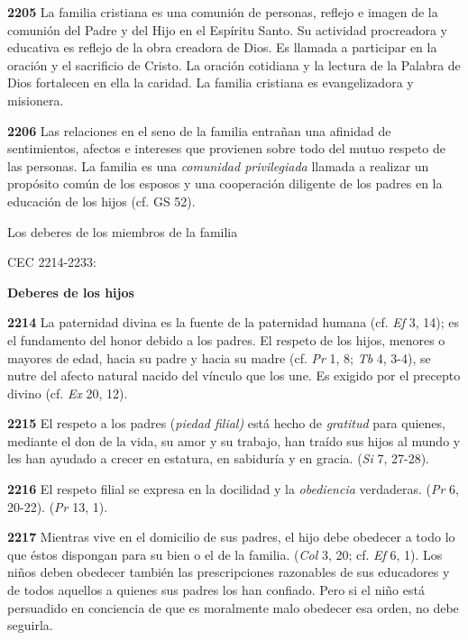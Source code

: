 \begin{body}
\begin{body}
\textbf{2205} La familia cristiana es una comunión de personas, reflejo e imagen de la comunión del Padre y del Hijo en el Espíritu Santo. Su actividad procreadora y educativa es reflejo de la obra creadora de Dios. Es llamada a participar en la oración y el sacrificio de Cristo. La oración cotidiana y la lectura de la Palabra de Dios fortalecen en ella la caridad. La familia cristiana es evangelizadora y misionera.

\textbf{2206} Las relaciones en el seno de la familia entrañan una afinidad de sentimientos, afectos e intereses que provienen sobre todo del mutuo respeto de las personas. La familia es una \emph{comunidad privilegiada} llamada a realizar un propósito común de los esposos y una cooperación diligente de los padres en la educación de los hijos (cf. GS 52).

Los deberes de los miembros de la familia

CEC 2214-2233:

\textbf{Deberes de los hijos}

\textbf{2214} La paternidad divina es la fuente de la paternidad humana (cf. \emph{Ef} 3, 14); es el fundamento del honor debido a los padres. El respeto de los hijos, menores o mayores de edad, hacia su padre y hacia su madre (cf. \emph{Pr} 1, 8; \emph{Tb} 4, 3-4), se nutre del afecto natural nacido del vínculo que los une. Es exigido por el precepto divino (cf. \emph{Ex} 20, 12).

\textbf{2215} El respeto a los padres (\emph{piedad filial)} está hecho de \emph{gratitud} para quienes, mediante el don de la vida, su amor y su trabajo, han traído sus hijos al mundo y les han ayudado a crecer en estatura, en sabiduría y en gracia.  (\emph{Si} 7, 27-28).

\textbf{2216} El respeto filial se expresa en la docilidad y la \emph{obediencia} verdaderas.  (\emph{Pr} 6, 20-22).  (\emph{Pr} 13, 1).

\textbf{2217} Mientras vive en el domicilio de sus padres, el hijo debe obedecer a todo lo que éstos dispongan para su bien o el de la familia.  (\emph{Col} 3, 20; cf. \emph{Ef} 6, 1). Los niños deben obedecer también las prescripciones razonables de sus educadores y de todos aquellos a quienes sus padres los han confiado. Pero si el niño está persuadido en conciencia de que es moralmente malo obedecer esa orden, no debe seguirla.


\end{body}
\end{body}

